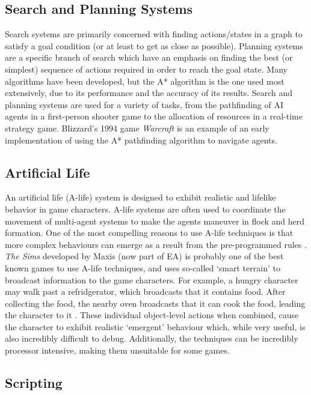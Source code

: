 \documentclass[a4paper,oneside]{report}
\begin{document}
\subsection{Search and Planning Systems} 

Search systems are primarily concerned with finding actions/states in a graph to satisfy a goal condition (or at least to get as close as possible). Planning systems are a specific branch of search which have an emphasis on finding the best (or simplest) sequence of actions required in order to reach the goal state. Many algorithms have been developed, but the A* algorithm is the one used most extensively, due to its performance and the accuracy of its results. Search and planning systems are used for a variety of tasks, from the pathfinding of AI agents in a first-person shooter game to the allocation of resources in a real-time strategy game. Blizzard's 1994 game \emph{Warcraft} is an example of an early implementation of using the A* pathfinding algorithm to navigate agents.

\subsection{Artificial Life} 

An artificial life (A-life) system is designed to exhibit realistic and lifelike behavior in game characters. A-life systems are often used to coordinate the movement of multi-agent systems to make the agents maneuver in flock and herd formation. One of the most compelling reasons to use A-life techniques is that more complex behaviours can emerge as a result from the pre-programmed rules \cite{Woodcock:bs}. \emph{The Sims} developed by Maxis (now part of EA) is probably one of the best known games to use A-life techniques, and uses so-called `smart terrain' to broadcast information to the game characters. For example, a hungry character may walk past a refridgerator, which broadcasts that it contains food. After collecting the food, the nearby oven broadcasts that it can cook the food, leading the character to it \cite{Woodcock:bs}. These individual object-level actions when combined, cause the character to exhibit realistic `emergent' behaviour which, while very useful, is also incredibly difficult to debug. Additionally, the techniques can be incredibly processor intensive, making them unsuitable for some games. 

\subsection{Scripting} 
\end{document}
